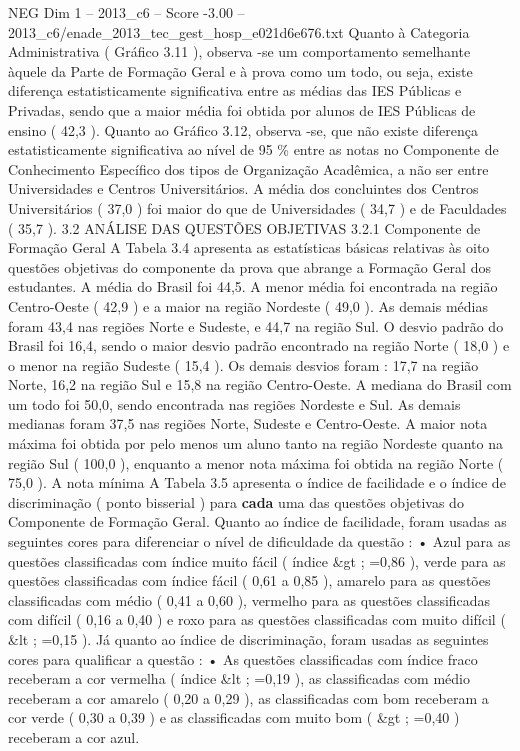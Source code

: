 \begin{textsample}{NEG Dim 1 – 2013\_c6 – Score -3.00 – 2013\_c6/enade\_2013\_tec\_gest\_hosp\_e021d6e676.txt}
Quanto à Categoria Administrativa ( Gráfico 3.11 ), observa -se um comportamento semelhante àquele da Parte de Formação Geral e à prova como um todo, ou seja, existe diferença estatisticamente significativa entre as médias das IES Públicas e Privadas, sendo que a maior média foi obtida por alunos de IES Públicas de ensino ( 42,3 ).
Quanto ao Gráfico 3.12, observa -se, que não existe diferença estatisticamente significativa ao nível de 95 \% entre as notas no Componente de Conhecimento Específico dos tipos de Organização Acadêmica, a não ser entre Universidades e Centros Universitários.
A média dos concluintes dos Centros Universitários ( 37,0 ) foi maior do que de Universidades ( 34,7 ) e de Faculdades ( 35,7 ). 3.2 ANÁLISE DAS QUESTÕES OBJETIVAS 3.2.1 Componente de Formação Geral A Tabela 3.4 apresenta as estatísticas básicas relativas às oito questões objetivas do componente da prova que abrange a Formação Geral dos estudantes.
A média do Brasil foi 44,5.
A menor média foi encontrada na região Centro-Oeste ( 42,9 ) e a maior na região Nordeste ( 49,0 ).
As demais médias foram 43,4 nas regiões Norte e Sudeste, e 44,7 na região Sul.
O desvio padrão do Brasil foi 16,4, sendo o maior desvio padrão encontrado na região Norte ( 18,0 ) e o menor na região Sudeste ( 15,4 ).
Os demais desvios foram : 17,7 na região Norte, 16,2 na região Sul e 15,8 na região Centro-Oeste.
A mediana do Brasil com um todo foi 50,0, sendo encontrada nas regiões Nordeste e Sul.
As demais medianas foram 37,5 nas regiões Norte, Sudeste e Centro-Oeste.
A maior nota máxima foi obtida por pelo menos um aluno tanto na região Nordeste quanto na região Sul ( 100,0 ), enquanto a menor nota máxima foi obtida na região Norte ( 75,0 ).
A nota mínima A Tabela 3.5 apresenta o índice de facilidade e o índice de discriminação ( ponto bisserial ) para \textbf{cada} uma das questões objetivas do Componente de Formação Geral.
Quanto ao índice de facilidade, foram usadas as seguintes cores para diferenciar o nível de dificuldade da questão : • Azul para as questões classificadas com índice muito fácil ( índice \&gt ; =0,86 ), verde para as questões classificadas com índice fácil ( 0,61 a 0,85 ), amarelo para as questões classificadas com médio ( 0,41 a 0,60 ), vermelho para as questões classificadas com difícil ( 0,16 a 0,40 ) e roxo para as questões classificadas com muito difícil ( \&lt ; =0,15 ).
Já quanto ao índice de discriminação, foram usadas as seguintes cores para qualificar a questão : • As questões classificadas com índice fraco receberam a cor vermelha ( índice \&lt ; =0,19 ), as classificadas com médio receberam a cor amarelo ( 0,20 a 0,29 ), as classificadas com bom receberam a cor verde ( 0,30 a 0,39 ) e as classificadas com muito bom ( \&gt ; =0,40 ) receberam a cor azul.

\end{textsample}
